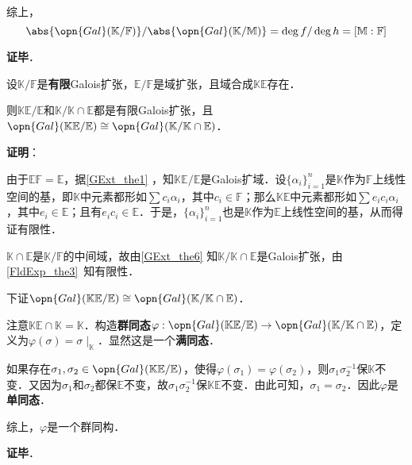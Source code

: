 综上，
\begin{equation}
\abs{\opn{Gal}(\mathbb{K}/\mathbb{F})}/\abs{\opn{Gal}(\mathbb{K}/\mathbb{M})}=\deg f/\deg h=[\mathbb{M}:\mathbb{F}]
\end{equation}

\textbf{证毕}．





\begin{theorem}{}\label{GExt_the7}
设$\mathbb{K}/\mathbb{F}$是\textbf{有限}Galois扩张，$\mathbb{E}/\mathbb{F}$是域扩张，且域合成$\mathbb{KE}$存在．

则$\mathbb{KE}/\mathbb{E}$和$\mathbb{K}/\mathbb{K}\cap\mathbb{E}$都是有限Galois扩张，且$\opn{Gal}(\mathbb{KE}/\mathbb{E})\cong\opn{Gal}(\mathbb{K}/\mathbb{K}\cap\mathbb{E})$．
\end{theorem}

\textbf{证明}：

由于$\mathbb{E}\mathbb{F}=\mathbb{E}$，据\autoref{GExt_the1} ，知$\mathbb{KE}/\mathbb{E}$是Galois扩域．设$\{\alpha_i\}_{i=1}^n$是$\mathbb{K}$作为$\mathbb{F}$上线性空间的基，即$\mathbb{K}$中元素都形如$\sum c_i\alpha_i$，其中$c_i\in\mathbb{F}$；那么$\mathbb{KE}$中元素都形如$\sum e_ic_i\alpha_i$，其中$e_i\in\mathbb{E}$；且有$e_ic_i\in\mathbb{E}$．于是，$\{\alpha_i\}_{i=1}^n$也是$\mathbb{K}$作为$\mathbb{E}$上线性空间的基，从而得证有限性．

$\mathbb{K}\cap\mathbb{E}$是$\mathbb{K}/\mathbb{F}$的中间域，故由\autoref{GExt_the6} 知$\mathbb{K}/\mathbb{K}\cap\mathbb{E}$是Galois扩张，由\autoref{FldExp_the3}~知有限性．

下证$\opn{Gal}(\mathbb{KE}/\mathbb{E})\cong\opn{Gal}(\mathbb{K}/\mathbb{K}\cap\mathbb{E})$．

注意$\mathbb{KE}\cap \mathbb{K}=\mathbb{K}$．构造\textbf{群同态}$\varphi:\opn{Gal}(\mathbb{KE}/\mathbb{E})\to\opn{Gal}(\mathbb{K}/\mathbb{K}\cap\mathbb{E})$，定义为$\varphi (\sigma) = \sigma\mid_{\mathbb{K}}$．显然这是一个\textbf{满同态}．

如果存在$\sigma_1, \sigma_2\in\opn{Gal}(\mathbb{KE}/\mathbb{E})$，使得$\varphi(\sigma_1)=\varphi(\sigma_2)$，则$\sigma_1\sigma_2^{-1}$保$\mathbb{K}$不变．又因为$\sigma_1$和$\sigma_2$都保$\mathbb{E}$不变，故$\sigma_1\sigma_2^{-1}$保$\mathbb{KE}$不变．由此可知，$\sigma_1=\sigma_2$．因此$\varphi$是\textbf{单同态}．

综上，$\varphi$是一个群同构．

\textbf{证毕}．











